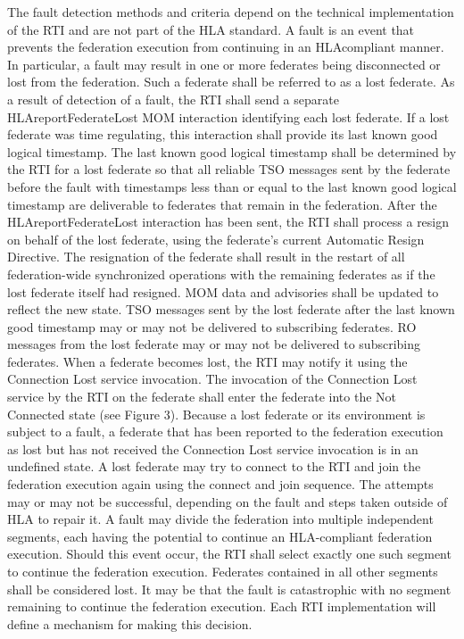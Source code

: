 The fault detection methods and criteria depend on the technical implementation of the RTI and are not part of the HLA standard. A fault is an event that prevents the federation execution from continuing in an HLAcompliant manner. In particular, a fault may result in one or more federates being disconnected or lost from the federation. Such a federate shall be referred to as a lost federate. As a result of detection of a fault, the RTI shall send a separate HLAreportFederateLost MOM interaction identifying each lost federate. If a lost federate was time regulating, this interaction shall provide its last known good logical timestamp. The last known good logical timestamp shall be determined by the RTI for a lost federate so that all reliable TSO messages sent by the federate before the fault with timestamps less than or equal to the last known good logical timestamp are deliverable to federates that remain in the federation. After the HLAreportFederateLost interaction has been sent, the RTI shall process a resign on behalf of the lost federate, using the federate's current Automatic Resign Directive. The resignation of the federate shall result in the restart of all federation-wide synchronized operations with the remaining federates as if the lost federate itself had resigned. MOM data and advisories shall be updated to reflect the new state. TSO messages sent by the lost federate after the last known good timestamp may or may not be delivered to subscribing federates. RO messages from the lost federate may or may not be delivered to subscribing federates. When a federate becomes lost, the RTI may notify it using the Connection Lost \rtiinitiated{} service invocation. The invocation of the Connection Lost \rtiinitiated{} service by the RTI on the federate shall enter the federate into the Not Connected state (see Figure 3). Because a lost federate or its environment is subject to a fault, a federate that has been reported to the federation execution as lost but has not received the Connection Lost \rtiinitiated{} service invocation is in an undefined state. A lost federate may try to connect to the RTI and join the federation execution again using the connect and join sequence. The attempts may or may not be successful, depending on the fault and steps taken outside of HLA to repair it. A fault may divide the federation into multiple independent segments, each having the potential to continue an HLA-compliant federation execution. Should this event occur, the RTI shall select exactly one such segment to continue the federation execution. Federates contained in all other segments shall be considered lost. It may be that the fault is catastrophic with no segment remaining to continue the federation execution. Each RTI implementation will define a mechanism for making this decision.


